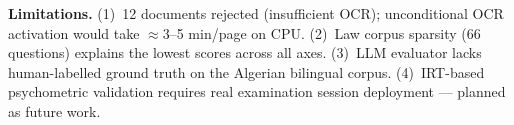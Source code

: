 \textbf{Limitations.}
(1)~12 documents rejected (insufficient OCR); unconditional OCR activation would
take $\approx$3--5 min/page on CPU.
(2)~Law corpus sparsity (66 questions) explains the lowest scores across all axes.
(3)~LLM evaluator lacks human-labelled ground truth on the Algerian bilingual corpus.
(4)~IRT-based psychometric validation \cite{isley2025quality} requires real
examination session deployment --- planned as future work.
